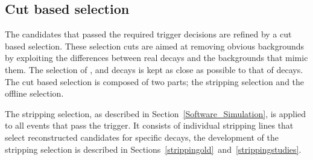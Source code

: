 


\subsection{Cut based selection}
\label{sec:cutbasedsel}
The \bmumu candidates that passed the required trigger decisions are refined by a cut based selection. These selection cuts are aimed at removing obvious backgrounds by exploiting the differences between real \bmumu decays and the backgrounds that mimic them. The selection of \bhh, \bujpsik and \bsjpisphi decays is kept as close as possible to that of \bmumu decays. The cut based selection is composed of two parts; the stripping selection and the offline selection. 

The stripping selection, as described in Section~\ref{Software_Simulation}, is applied to all events that pass the trigger. It consists of individual stripping lines that select reconstructed candidates for specific decays, the development of the stripping selection is described in Sections~\ref{strippingold}~and~\ref{strippingstudies}.%



